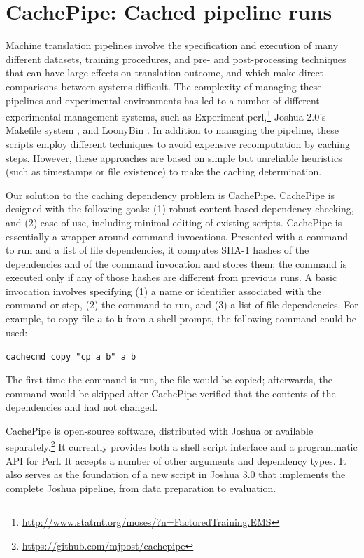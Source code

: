 \documentclass[11pt]{article}
\begin{document}
\section{CachePipe: Cached pipeline runs}

Machine translation pipelines involve the specification and execution
of many different datasets, training procedures, and pre- and
post-processing techniques that can have large effects on translation
outcome, and which make direct comparisons between systems difficult.
The complexity of managing these pipelines and experimental
environments has led to a number of different experimental management
systems, such as
Experiment.perl,\footnote{\url{http://www.statmt.org/moses/?n=FactoredTraining.EMS}}
Joshua 2.0's Makefile system \cite{li2010joshua}, and LoonyBin
\cite{clark2010loonybin}.  In addition to managing the pipeline, these
scripts employ different techniques to avoid expensive recomputation
by caching steps.  However, these
approaches are based on simple but unreliable heuristics (such as
timestamps or file existence) to make the
caching determination.

Our solution to the caching dependency problem is CachePipe.
CachePipe is designed with the following goals: (1) robust
content-based dependency checking, and (2) ease of use, including
minimal editing of existing scripts.  CachePipe is essentially a
wrapper around command invocations.  Presented with a command to run
and a list of file dependencies, it computes SHA-1 hashes of the
dependencies and of the command invocation and stores them; the
command is executed only if any of those hashes are different from
previous runs.  A basic invocation involves specifying (1) a name or
identifier associated with the command or step, (2) the command to
run, and (3) a list of file dependencies.  For example, to copy file
\verb|a| to \verb|b| from a shell prompt, the following command could
be used:

\verb|cachecmd copy "cp a b" a b|

\noindent The first time the command is run, the file would be copied;
afterwards, the command would be skipped after CachePipe verified that
the contents of the dependencies and had not changed.

CachePipe is open-source software, distributed with Joshua or
available
separately.\footnote{\url{https://github.com/mjpost/cachepipe}} It
currently provides both a shell script interface and a programmatic
API for Perl.  It accepts a number of other arguments and dependency
types.  It also serves as the foundation of a new script in Joshua 3.0
that implements the complete Joshua pipeline, from data preparation to
evaluation.
\end{document}
